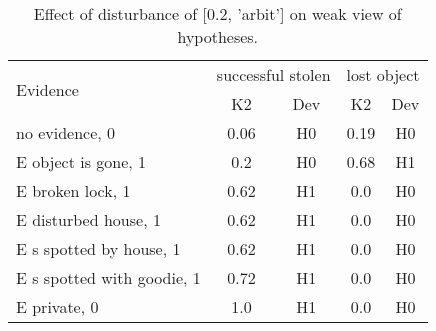 \begin{table}\begin{tabular}{l|cc|cc}\toprule\multirow{2}{*}{Evidence} & \multicolumn{2}{c}{successful stolen}& \multicolumn{2}{c}{lost object}\\& {K2} & {Dev}& {K2} & {Dev}\\\midrule
no evidence, 0 & \cellcolor{Bittersweet}0.06&\cellcolor{Bittersweet}H0&\cellcolor{Bittersweet}0.19&\cellcolor{Bittersweet}H0\\E object is gone, 1 & \cellcolor{Bittersweet}0.2&\cellcolor{Bittersweet}H0&\cellcolor{Bittersweet}0.68&\cellcolor{Bittersweet}H1\\E broken lock, 1 & \cellcolor{Bittersweet}0.62&\cellcolor{Bittersweet}H1&\cellcolor{Bittersweet}0.0&\cellcolor{Bittersweet}H0\\E disturbed house, 1 & \cellcolor{Bittersweet}0.62&\cellcolor{Bittersweet}H1&\cellcolor{Bittersweet}0.0&\cellcolor{Bittersweet}H0\\E s spotted by house, 1 & \cellcolor{Bittersweet}0.62&\cellcolor{Bittersweet}H1&\cellcolor{Bittersweet}0.0&\cellcolor{Bittersweet}H0\\E s spotted with goodie, 1 & \cellcolor{Bittersweet}0.72&\cellcolor{Bittersweet}H1&\cellcolor{Bittersweet}0.0&\cellcolor{Bittersweet}H0\\E private, 0 & \cellcolor{Bittersweet}1.0&\cellcolor{Bittersweet}H1&\cellcolor{Bittersweet}0.0&\cellcolor{Bittersweet}H0\\\bottomrule\end{tabular}\caption{Effect of disturbance of [0.2, 'arbit'] on weak view of hypotheses.}\end{table}